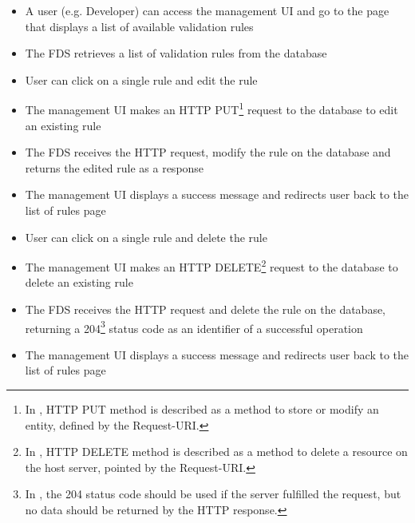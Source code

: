 \begin{itemize}
 \item A user (e.g. Developer) can access the management UI and go to the page that displays a list of available validation rules
 \item The FDS retrieves a list of validation rules from the database
 \item User can click on a single rule and edit the rule
 \item The management UI makes an HTTP PUT\footnote{In \autocite[\enquote{9.6 PUT}]{http-rfc}, HTTP PUT method is described as a method to store or modify an entity, defined by the Request-URI.} request to the database to edit an existing rule
 \item The FDS receives the HTTP request, modify the rule on the database and returns the edited rule as a response
 \item The management UI displays a success message and redirects user back to the list of rules page
 \item User can click on a single rule and delete the rule
 \item The management UI makes an HTTP DELETE\footnote{In \autocite[\enquote{9.7 DELETE}]{http-rfc}, HTTP DELETE method is described as a method to delete a resource on the host server, pointed by the Request-URI.} request to the database to delete an existing rule
 \item The FDS receives the HTTP request and delete the rule on the database, returning a 204\footnote{In \autocite[\enquote{10.2.5 204 No Content}]{http-rfc}, the 204 status code should be used if the server fulfilled the request, but no data should be returned by the HTTP response.} status code as an identifier of a successful operation
 \item The management UI displays a success message and redirects user back to the list of rules page
\end{itemize} 